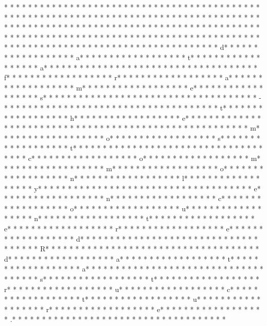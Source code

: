 * * *  * * *  * * *  *  * * *  *  * * *  * 	* * *  * * *  * * *  *  * * *  *  * * *  * 	* * *  * * *  * * *  *  * * *  *  * * *  * * *  * * *  *  * * *  *  * * *  * * *  * * *  *  * * *  *  * * *  *  * * *  * * *  * * *  *  * * *  *  * * *  *  * * *  * * *  * * *  *  * * *  *  * * *  *  * * *  * * *  * * *  *  * * *  *  * * *  *  * * *  * * *  * * *  *  * * *  *  * * *  *  * * *  * * *  * * *  *  * * *  *  * * *  *  * * *  * * *  * * *  *  * * *  *  * * *  *  * * *  * * *  * * *  *  * * *  *  * * *  * d* * *  * * *  * * *  *  * * *  *  * * *  * a* * *  * * *  * * *  *  * * *  *  * * *  * t* * *  * * *  * * *  *  * * *  *  * * *  * a* * *  * * *  * * *  *  * * *  *  * * *  *  * * *  * * *  * * *  *  * * *  *  * * *  * f* * *  * * *  * * *  *  * * *  *  * * *  * r* * *  * * *  * * *  *  * * *  *  * * *  * a* * *  * * *  * * *  *  * * *  *  * * *  * m* * *  * * *  * * *  *  * * *  *  * * *  * e* * *  * * *  * * *  *  * * *  *  * * *  * s* * *  * * *  * * *  *  * * *  *  * * *  *  * * *  * * *  * * *  *  * * *  *  * * *  * -* * *  * * *  * * *  *  * * *  *  * * *  *  * * *  * * *  * * *  *  * * *  *  * * *  * t* * *  * * *  * * *  *  * * *  *  * * *  * h* * *  * * *  * * *  *  * * *  *  * * *  * e* * *  * * *  * * *  *  * * *  *  * * *  *  * * *  * * *  * * *  *  * * *  *  * * *  *  * * *  * * *  * * *  *  * * *  *  * * *  * m* * *  * * *  * * *  *  * * *  *  * * *  * o* * *  * * *  * * *  *  * * *  *  * * *  * s* * *  * * *  * * *  *  * * *  *  * * *  * t* * *  * * *  * * *  *  * * *  *  * * *  *  * * *  * * *  * * *  *  * * *  *  * * *  * c* * *  * * *  * * *  *  * * *  *  * * *  * o* * *  * * *  * * *  *  * * *  *  * * *  * m* * *  * * *  * * *  *  * * *  *  * * *  * m* * *  * * *  * * *  *  * * *  *  * * *  * o* * *  * * *  * * *  *  * * *  *  * * *  * n* * *  * * *  * * *  *  * * *  *  * * *  * l* * *  * * *  * * *  *  * * *  *  * * *  * y* * *  * * *  * * *  *  * * *  *  * * *  *  * * *  * * *  * * *  *  * * *  *  * * *  * e* * *  * * *  * * *  *  * * *  *  * * *  * n* * *  * * *  * * *  *  * * *  *  * * *  * c* * *  * * *  * * *  *  * * *  *  * * *  * o* * *  * * *  * * *  *  * * *  *  * * *  * u* * *  * * *  * * *  *  * * *  *  * * *  * n* * *  * * *  * * *  *  * * *  *  * * *  * t* * *  * * *  * * *  *  * * *  *  * * *  * e* * *  * * *  * * *  *  * * *  *  * * *  * r* * *  * * *  * * *  *  * * *  *  * * *  * e* * *  * * *  * * *  *  * * *  *  * * *  * d* * *  * * *  * * *  *  * * *  *  * * *  *  * * *  * * *  * * *  *  * * *  *  * * *  * R* * *  * * *  * * *  *  * * *  *  * * *  *  * * *  * * *  * * *  *  * * *  *  * * *  * d* * *  * * *  * * *  *  * * *  *  * * *  * a* * *  * * *  * * *  *  * * *  *  * * *  * t* * *  * * *  * * *  *  * * *  *  * * *  * a* * *  * * *  * * *  *  * * *  *  * * *  *  * * *  * * *  * * *  *  * * *  *  * * *  * s* * *  * * *  * * *  *  * * *  *  * * *  * t* * *  * * *  * * *  *  * * *  *  * * *  * r* * *  * * *  * * *  *  * * *  *  * * *  * u* * *  * * *  * * *  *  * * *  *  * * *  * c* * *  * * *  * * *  *  * * *  *  * * *  * t* * *  * * *  * * *  *  * * *  *  * * *  * u* * *  * * *  * * *  *  * * *  *  * * *  * r* * *  * * *  * * *  *  * * *  *  * * *  * e* * *  * * *  * * *  *  * * *  *  * * *  * .* * *  * * *  * * *  *  * * *  *  * * *  *  * * *  * * *  * * *  *  * * *  *  * * *  * 
